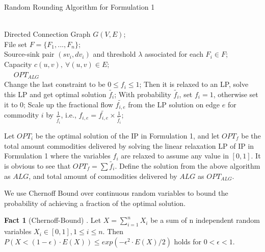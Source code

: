\documentclass[onecolumn,11pt,journal, compsoc]{IEEEtran}
\begin{document}
		 \begin{algorithm}[t]
		 	\small
		 	\renewcommand{\algorithmicrequire}{\textbf{Input:}}
		 	\renewcommand\algorithmicensure {\textbf{Output:} }
		 	\caption{Random Rounding Algorithm for Formulation 1}
		 	\label{alg:randomrounding}
		 	\begin{algorithmic}[1] %
		 		\REQUIRE ~~\\ %
		 		Directed Connection Graph $G(V, E)$;\\
		 		File set $F = \{F_1, ..., F_n\}$;\\
		 		Source-sink pair $(sv_i, dv_i)$ and threshold $\lambda$ associated for each $ F_i \in F$;\\
		 		Capacity $c(u, v), ~ \forall (u, v)\in E$;\\
		 		\ENSURE ~~ $OPT_{ALG}$\\ 
		 		\STATE Change the last constraint to be 
		 		$0 \leq f_i \leq 1$;
		 		\STATE Then it is relaxed to an LP, solve this LP and get optimal solution $\tilde{f_i}$;
		 		\STATE With probability $\tilde{f_i}$, set $f_i = 1$, otherwise set it to $0$;
		 		\STATE Scale up the fractional flow $\tilde{f_{i,e}}$ from the LP solution on edge $e$ for commodity $i$ by $\frac{1}{\tilde{f_i}}$, i.e., $f_{i,e} = \tilde{f_{i,e}} \times \frac{1}{\tilde{f_i}}$;

		 	\end{algorithmic}
		 \end{algorithm}
	
	
	
Let $OPT_i$ be the optimal solution of the IP in Formulation 1, and let $OPT_f$ be the total amount commodities delivered by solving the linear relaxation LP of IP in Formulation 1 where the variables $f_i$ are relaxed to assume any value in $[0, 1]$. It is obvious to see that $OPT_f = \sum{\tilde{f_i}}$. Define the solution from the above algorithm as $ALG$, and total amount of commodities delivered by $ALG$ as $OPT_{ALG}$. 

We use Chernoff Bound over continuous random variables to bound the probability of achieving a fraction of the optimal solution.

\textbf{Fact 1} (Chernoff-Bound)\label{CB} . Let $X=\sum_{i=1}^{n}X_i$ be a sum of n independent random variables $X_i \in [0,1], 1\le i \le n$. Then $P(X<(1-\epsilon) \cdot E(X)) \le exp(-\epsilon^2 \cdot E(X)/2)$ holds for $0 < \epsilon < 1$.
\end{document}
